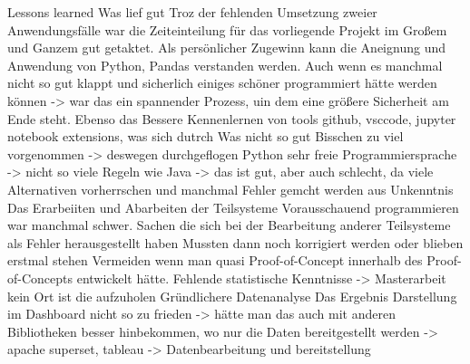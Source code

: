 Lessons learned
Was lief gut
Troz der fehlenden Umsetzung zweier Anwendungsfälle war die Zeiteinteilung für das vorliegende Projekt im Großem und Ganzem gut getaktet. Als persönlicher Zugewinn 
kann die Aneignung und Anwendung von Python, Pandas verstanden werden.
Auch wenn es manchmal nicht so gut klappt und sicherlich einiges schöner programmiert hätte werden können -> war das ein spannender Prozess, uin dem eine größere Sicherheit am Ende steht. Ebenso das Bessere Kennenlernen von tools github, vsccode, jupyter notebook extensions, was sich dutrch 
Was nicht so gut
Bisschen zu viel vorgenommen -> deswegen durchgeflogen
Python sehr freie Programmiersprache -> nicht so viele Regeln wie Java -> das ist gut, aber auch schlecht, da viele Alternativen vorherrschen und manchmal Fehler gemcht werden aus Unkenntnis
Das Erarbeiiten und Abarbeiten der Teilsysteme Vorausschauend programmieren war manchmal schwer. Sachen die sich bei der Bearbeitung anderer Teilsysteme als Fehler herausgestellt haben
Mussten dann noch korrigiert werden oder blieben erstmal stehen
Vermeiden wenn man quasi Proof-of-Concept innerhalb des Proof-of-Concepts entwickelt hätte.
Fehlende statistische Kenntnisse -> Masterarbeit kein Ort ist die aufzuholen
Gründlichere Datenanalyse
Das Ergebnis Darstellung im Dashboard nicht so zu frieden -> hätte man das auch mit anderen Bibliotheken besser hinbekommen, wo nur die Daten bereitgestellt werden -> apache superset, tableau -> Datenbearbeitung und bereitstellung

